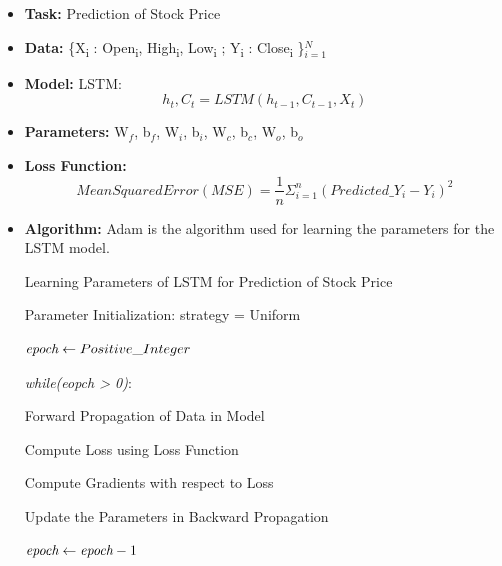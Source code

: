 \begin{itemize}
		
\item \textbf{Task: } Prediction of Stock Price
			
\item \textbf{Data: } \{X\textsubscript{i} : Open\textsubscript{i}, High\textsubscript{i}, Low\textsubscript{i} ; Y\textsubscript{i} : Close\textsubscript{i} \}$_{i =1}^{N}$		%
			
\item \textbf{Model: } LSTM: \begin{equation} h_{t}, C_{t} = LSTM(h_{t-1}, C_{t-1}, X_{t}) \end{equation} 	
			
\item \textbf{Parameters: } W$_{f}$, b$_{f}$, W$_{i}$, b$_{i}$, W$_{c}$,  b$_{c}$, W$_{o}$, b$_{o}$ 

\item \textbf{Loss Function: } \begin{equation}Mean Squared Error (MSE) =  \frac{1}{n}\Sigma_{i=1}^{n} (Predicted\_Y_{i} - Y_{i})^2
 \end{equation}

\item \textbf{Algorithm: } Adam is the algorithm used for learning the parameters for the LSTM model.


\begin{algorithm}[H]

\caption{Learning Parameters of LSTM for Prediction of Stock Price}

\begin{algorithmic}[1] 
						
\STATE Parameter Initialization: {strategy = Uniform} 

\STATE $\emph{epoch} \gets Positive\_Integer$

\STATE \emph{while(eopch > 0)}:

\STATE \tab	Forward Propagation of Data in Model

\STATE \tab	Compute Loss using Loss Function

\STATE \tab	Compute Gradients with respect to Loss

\STATE \tab	Update the Parameters in Backward Propagation	

\STATE\tab	$\emph{epoch} \gets \emph{epoch}-1$

\end{algorithmic}

\end{algorithm}

\end{itemize}

